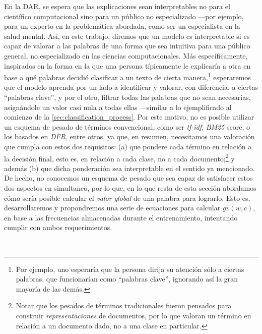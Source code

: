 En la DAR, se espera que las explicaciones sean interpretables no para el científico computacional sino para un público no especializado ---por ejemplo, para un experto en la problemática abordada, como ser un especialista en la salud mental.
Así, en este trabajo, diremos que un modelo es interpretable si es capaz de valorar a las palabras de una forma que sea intuitiva para una público general, no especializado en las ciencias computacionales.
Más específicamente, inspirados en la forma en la que una persona típicamente le explicaría a otra en base a qué palabras decidió clasificar a un texto de cierta manera,\footnote{Por ejemplo, uno esperaría que la persona dirija su atención sólo a ciertas palabras, que funcionarían como ``palabras clave'', ignorando así la gran mayoría de las demás.} esperaremos que el modelo aprenda por un lado a identificar y valorar, con diferencia, a ciertas ``palabras clave'', y por el otro, filtrar todas las palabras que no sean necesarias, asignándole un valor casi nula a todas ellas ---similar a lo ejemplificado al comienzo de la \autoref{sec:classification_process}.
Por este motivo, no es posible utilizar un esquema de pesado de términos convencional, como ser \emph{tf-idf}, \emph{BM25} score, o los basados en \emph{DFR}, entre otros, ya que, en resumen, necesitamos una valoración que cumpla con estos dos requisitos: (a) que pondere cada término en relación a la decisión final, esto es, en relación a cada clase, no a cada documento;\footnote{Notar que los pesados de términos tradicionales fueron pensados para construir \emph{representaciones} de documentos, por lo que valoran un término en relación a un documento dado, no a una clase en particular.} y además (b) que dicha ponderación sea interpretable en el sentido ya mencionado.
De hecho, no conocemos un esquema de pesado que sea capaz de satisfacer estos dos aspectos en simultaneo, por lo que, en lo que resta de esta sección abordamos cómo sería posible calcular el \emph{valor global} de una palabra para lograrlo.
Esto es, desarrollaremos y propondremos una serie de ecuaciones para calcular $gv(w, c)$, en base a las frecuencias almacenadas durante el entrenamiento, intentando cumplir con ambos requerimientos.

\

